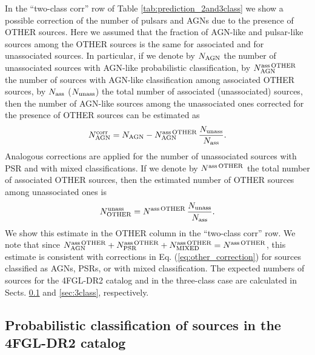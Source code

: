 \documentclass[referee]{aa} %
\newcommand{\bea}{\begin{eqnarray}}
\newcommand{\eea}{\end{eqnarray}}
\newcommand{\lb}{\label}
\begin{document}
In the ``two-class corr'' row of Table \ref{tab:prediction_2and3class}
we show a possible correction of the number of pulsars and AGNs due to the presence of OTHER sources.
Here we assumed that the fraction of AGN-like and pulsar-like sources among the OTHER sources is the same for associated and for unassociated sources.
In particular, if we denote by $N_{\rm AGN}$ the number of unassociated sources with AGN-like probabilistic classification,
by $N_{\rm AGN}^{\rm ass\,OTHER}$ the number of sources with AGN-like classification among associated OTHER sources,
by $N_{\rm ass}$ ($N_{\rm unass}$) the total number of associated (unassociated) sources, then
the number of AGN-like sources among the unassociated ones corrected for the presence of OTHER sources can be estimated as
\bea
\lb{eq:other_correction}
N_{\rm AGN}^{\rm corr} = N_{\rm AGN} - N_{\rm AGN}^{\rm ass\,OTHER} \,\frac{N_{\rm unass}}{N_{\rm ass}}.
\eea
Analogous corrections are applied for the number of unassociated sources with PSR and with mixed classifications.
If we denote by $N^{\rm ass\,OTHER}$ the total number of associated OTHER sources, then the estimated number of 
OTHER sources among unassociated ones is
\bea
\lb{eq:2class_other}
N^{\rm unass}_{\rm OTHER} = N^{\rm ass\,OTHER} \,\frac{N_{\rm unass}}{N_{\rm ass}}.
\eea
We show this estimate in the OTHER column in the ``two-class corr'' row.
We note that since 
$N_{\rm AGN}^{\rm ass\,OTHER} + N_{\rm PSR}^{\rm ass\,OTHER} + N_{\rm MIXED}^{\rm ass\,OTHER} = N^{\rm ass\,OTHER}$,
this estimate is consistent with corrections in Eq. (\ref{eq:other_correction}) for sources classified as AGNs, PSRs, or with mixed classification.
The expected numbers of sources for the 4FGL-DR2 catalog and in the three-class case are calculated in Sects. \ref{sec:4FGLprediction}
and \ref{sec:3class}, respectively.


\subsection{Probabilistic classification of sources in the 4FGL-DR2 catalog}
\lb{sec:4FGLprediction}
\end{document}
